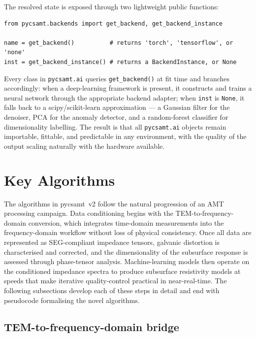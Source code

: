 \documentclass[review,12pt]{elsarticle}
\begin{document}
The resolved state is exposed through two lightweight public functions:

\begin{lstlisting}[style=pycode, caption={Querying the active backend at runtime.}]
from pycsamt.backends import get_backend, get_backend_instance

name = get_backend()          # returns 'torch', 'tensorflow', or 'none'
inst = get_backend_instance() # returns a BackendInstance, or None
\end{lstlisting}

Every class in \texttt{pycsamt.ai} queries \texttt{get\_backend()} at fit
time and branches accordingly: when a deep-learning framework is present, it
constructs and trains a neural network through the appropriate backend
adapter; when \texttt{inst} is \texttt{None}, it falls back to a
scipy/scikit-learn approximation — a Gaussian filter for the denoiser,
PCA for the anomaly detector, and a random-forest classifier for
dimensionality labelling.
The result is that all \texttt{pycsamt.ai} objects remain importable,
fittable, and predictable in any environment, with the quality of the
output scaling naturally with the hardware available.


\section{Key Algorithms}
\label{sec:algorithms}

The algorithms in pycsamt~v2 follow the natural progression of an AMT
processing campaign.
Data conditioning begins with the TEM-to-frequency-domain conversion, which
integrates time-domain measurements into the frequency-domain workflow
without loss of physical consistency.
Once all data are represented as SEG-compliant impedance tensors, galvanic
distortion is characterised and corrected, and the dimensionality of the
subsurface response is assessed through phase-tensor analysis.
Machine-learning models then operate on the conditioned impedance spectra
to produce subsurface resistivity models at speeds that make iterative
quality-control practical in near-real-time.
The following subsections develop each of these steps in  detail
and end with pseudocode formalising the novel algorithms.

\subsection{TEM-to-frequency-domain bridge}
\label{sec:tem2fd}
\end{document}
